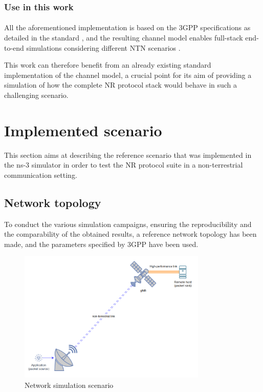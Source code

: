 \subsubsection{Use in this work}
\paragraph{}
All the aforementioned implementation is based on the \ac{3GPP} specifications as detailed in the standard \cite{3gpp-tr-38.811}, and the resulting channel model enables full-stack end-to-end simulations considering different \ac{NTN} scenarios \cite{Sandri_2023}.

This work can therefore benefit from an already existing standard implementation of the channel model, a crucial point for its aim of providing a simulation of how the complete \ac{NR} protocol stack would behave in such a challenging scenario. 

\section{Implemented scenario}

This section aims at describing the reference scenario that was implemented in the ns-3 simulator in order to test the \ac{NR} protocol suite in a non-terrestrial communication setting.

\subsection{Network topology}
To conduct the various simulation campaigns, ensuring the reproducibility and the comparability of the obtained results, a reference network topology has been made, and the parameters specified by \ac{3GPP} have been used.

\begin{figure}[ht]
    \centering
    \includegraphics[width=0.8\textwidth]{res/sim-scenario.png}
    \caption{Network simulation scenario}
    \label{fig:sim-scenario}
\end{figure}

